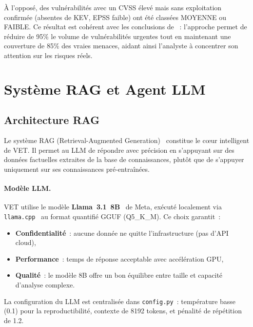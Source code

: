 \documentclass[runningheads]{llncs}
\begin{document}
À l'opposé, des vulnérabilités avec un CVSS élevé mais sans exploitation confirmée (absentes de KEV, EPSS faible) ont été classées MOYENNE ou FAIBLE. Ce résultat est cohérent avec les conclusions de~\cite{shimizu2023vmc} : l'approche permet de réduire de 95\% le volume de vulnérabilités \og urgentes \fg{} tout en maintenant une couverture de 85\% des vraies menaces, aidant ainsi l'analyste à concentrer son attention sur les risques réels.


\section{Système RAG et Agent LLM}

\subsection{Architecture RAG}

Le système RAG (Retrieval-Augmented Generation)~\cite{lewis2020rag} constitue le c\oe{}ur intelligent de VET. Il permet au LLM de répondre avec précision en s'appuyant sur des données factuelles extraites de la base de connaissances, plutôt que de s'appuyer uniquement sur ses connaissances pré-entraînées.

\paragraph{Modèle LLM.} VET utilise le modèle \textbf{Llama~3.1~8B}~\cite{llama3_2024} de Meta, exécuté localement via \texttt{llama.cpp}~\cite{llamacpp2024} au format quantifié GGUF (Q5\_K\_M). Ce choix garantit~:
\begin{itemize}[nosep]
    \item \textbf{Confidentialité}~: aucune donnée ne quitte l'infrastructure (pas d'API cloud),
    \item \textbf{Performance}~: temps de réponse acceptable avec accélération GPU,
    \item \textbf{Qualité}~: le modèle 8B offre un bon équilibre entre taille et capacité d'analyse complexe.
\end{itemize}

La configuration du LLM est centralisée dans \texttt{config.py}~: température basse (0.1) pour la reproductibilité, contexte de 8192 tokens, et pénalité de répétition de 1.2.
\end{document}
